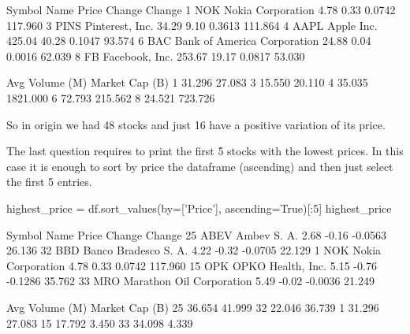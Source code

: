 \begin{solution}
\begin{ioutput}
  Symbol                         Name   Price  Change  Change%
1    NOK            Nokia Corporation    4.78    0.33   0.0742     117.960
3   PINS              Pinterest, Inc.   34.29    9.10   0.3613     111.864
4   AAPL                   Apple Inc.  425.04   40.28   0.1047      93.574
6    BAC  Bank of America Corporation   24.88    0.04   0.0016      62.039
8     FB               Facebook, Inc.  253.67   19.17   0.0817      53.030

   Avg Volume (M)  Market Cap (B)
1          31.296          27.083
3          15.550          20.110
4          35.035        1821.000
6          72.793         215.562
8          24.521         723.726
\end{ioutput}
        
So in origin we had 48 stocks and just 16 have a positive variation of its price.

The last question requires to print the first 5 stocks with the lowest prices. In this case it is enough to sort by price the dataframe (ascending) and then just select the first 5 entries.

\begin{ipython}
highest_price = df.sort_values(by=['Price'], ascending=True)[:5]
highest_price
\end{ipython}
\begin{ioutput}
   Symbol                      Name  Price  Change  Change%
25   ABEV               Ambev S. A.   2.68   -0.16  -0.0563      26.136
32    BBD      Banco Bradesco S. A.   4.22   -0.32  -0.0705      22.129
1     NOK         Nokia Corporation   4.78    0.33   0.0742     117.960
15    OPK         OPKO Health, Inc.   5.15   -0.76  -0.1286      35.762
33    MRO  Marathon Oil Corporation   5.49   -0.02  -0.0036      21.249

    Avg Volume (M)  Market Cap (B)
25          36.654          41.999
32          22.046          36.739
1           31.296          27.083
15          17.792           3.450
33          34.098           4.339
\end{ioutput}
\end{solution}

